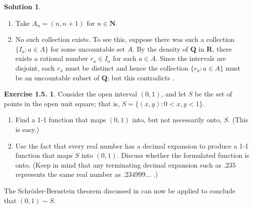 \documentclass[12pt]{article}
\theoremstyle{definition}
\theoremstyle{exercise}
\newtheorem{exercise}{Exercise 1.5.}
\theoremstyle{solution}
\newtheorem*{solution}{Solution}
\newcommand{\N}{\mathbf{N}}
\newcommand{\Q}{\mathbf{Q}}
\newcommand{\R}{\mathbf{R}}
\begin{document}
\begin{solution}
    \begin{enumerate}
        \item Take \( A_n = (n, n+1) \) for \( n \in \N \).

        \item No such collection exists. To see this, suppose there was such a collection \( \{ I_a : a \in A \} \) for some uncountable set \( A \). By the density of \( \Q \) in \( \R \), there exists a rational number \( r_a \in I_a \) for each \( a \in A \). Since the intervals are disjoint, each \( r_a \) must be distinct and hence the collection \( \{ r_a : a \in A \} \) must be an uncountable subset of \( \Q \); but this contradicts .
    \end{enumerate}
\end{solution}

\begin{exercise}
\label{ex:7}
    Consider the open interval \( (0, 1) \), and let \( S \) be the set of points in the open unit square; that is, \( S = \{ (x, y) : 0 < x, y < 1 \} \).
    \begin{enumerate}
        \item Find a 1-1 function that maps \( (0, 1) \) into, but not necessarily onto, \( S \). (This is easy.)

        \item Use the fact that every real number has a decimal expansion to produce a 1-1 function that maps \( S \) into \( (0, 1) \). Discuss whether the formulated function is onto. (Keep in mind that any terminating decimal expansion such as \( .235 \) represents the same real number as \( .234999 \ldots  \) .)
    \end{enumerate}
    The Schröder-Bernstein theorem discussed in  can now be applied to conclude that \( (0, 1) \sim S \).
\end{exercise}
\end{document}
